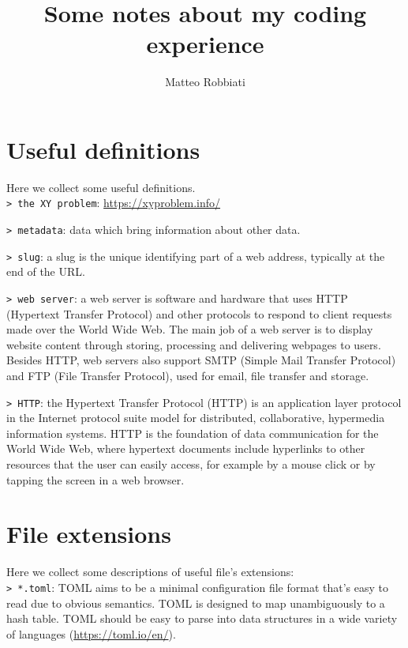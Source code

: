 \documentclass[11pt]{article}
\title{Some notes about my coding experience}
\author{Matteo Robbiati}
\date{}
\newcommand{\cmd}[1]{\colorbox{light-gray}{\textcolor{gio}{\texttt{#1}}}}
\begin{document}
\maketitle

\begin{multicols}{2}

\tableofcontents

\section{Useful definitions}

Here we collect some useful definitions. \\

\cmd{> the XY problem}: \href{https://xyproblem.info/}{https://xyproblem.info/}

\cmd{> metadata}: data which bring information about other data.

\cmd{> slug}: a slug is the unique identifying part of a web address, typically 
at the end of the URL.

\cmd{> web server}: a web server is software and hardware that uses HTTP 
(Hypertext Transfer Protocol) and other protocols to respond to client requests
 made over the World Wide Web. The main job of a web server is to display website 
 content through storing, processing and delivering webpages to users. Besides HTTP, 
 web servers also support SMTP (Simple Mail Transfer Protocol) and FTP 
 (File Transfer Protocol), used for email, file transfer and storage.

\cmd{> HTTP}: the Hypertext Transfer Protocol (HTTP) is an application layer 
protocol in the Internet protocol suite model for distributed, collaborative, 
hypermedia information systems. HTTP is the foundation of data communication for 
the World Wide Web, where hypertext documents include hyperlinks to other resources 
that the user can easily access, for example by a mouse click or by tapping the 
screen in a web browser.

\section{File extensions}

Here we collect some descriptions of useful file's extensions: \\

\cmd{> *.toml}: TOML aims to be a minimal configuration file format that's easy 
to read due to obvious semantics. TOML is designed to map unambiguously to a hash 
table. TOML should be easy to parse into data structures in a wide variety of 
languages (\href{https://toml.io/en/}{https://toml.io/en/}).


\end{multicols}
\end{document}
